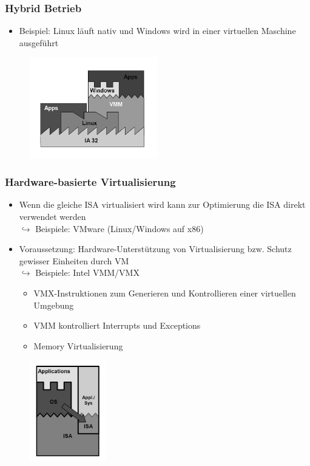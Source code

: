 \documentclass[a4paper,10pt]{scrreprt}
\begin{document}
	\subsubsection{Hybrid Betrieb}
	\begin{itemize}
		\item Beispiel: Linux läuft nativ und Windows wird in einer virtuellen Maschine ausgeführt
	\end{itemize}
	\begin{figure}[ht]
		\centering
		\includegraphics[width=0.5\textwidth]{images/hybrid}
	\end{figure}
	\subsubsection{Hardware-basierte Virtualisierung}
	\begin{itemize}
		\item Wenn die gleiche ISA virtualisiert wird kann zur Optimierung die ISA direkt verwendet werden\\[5pt]
		$\hookrightarrow$ Beispiele: VMware (Linux/Windows auf x86)
		\item Voraussetzung: Hardware-Unterstützung von Virtualisierung bzw. Schutz gewisser Einheiten durch VM\\[5pt]
		$\hookrightarrow$ Beispiele: Intel VMM/VMX
		\begin{itemize}
			\item VMX-Instruktionen zum Generieren und Kontrollieren einer virtuellen Umgebung
			\item VMM kontrolliert Interrupts und Exceptions
			\item Memory Virtualisierung
		\end{itemize}
	\end{itemize}
	\begin{figure}[ht]
		\centering
		\includegraphics[width=0.3\textwidth]{images/hardware}
	\end{figure}
\newpage
\end{document}
